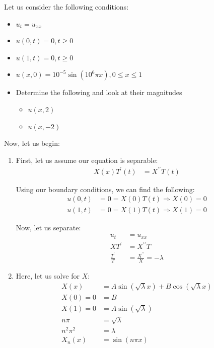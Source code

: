 \documentclass{article}
\begin{document}
\begin{enumerate}
  Let us consider the following conditions:
  \begin{itemize}
    \item $u_t = u_{xx}$
    \item $u(0, t) = 0, t \geq 0$
    \item $u(1, t) = 0, t \geq 0$
    \item $u(x, 0) = 10^{-5} \sin(10^6 \pi x), 0 \leq x \leq 1$
    \item Determine the following and look at their magnitudes
    \begin{itemize}
      \item $u(x, 2)$
      \item $u(x, -2)$
    \end{itemize}
  \end{itemize}

  Now, let us begin:

  \begin{enumerate}
    \item First, let us assume our equation is separable:
    \begin{align}
      X(x)T^\prime(t) & = X^{\prime\prime}T(t)
    \end{align}

    Using our boundary conditions, we can find the following:
    \begin{align}
      u(0, t) & = 0 = X(0)T(t) \Rightarrow X(0) = 0\\
      u(1, t) & = 0 = X(1)T(t) \Rightarrow X(1) = 0
    \end{align}

    Now, let us separate:
    \begin{align}
      u_t & = u_{xx}\\
      XT^\prime & = X^{\prime\prime}T\\
      \frac{T^\prime}{T} & = \frac{X^{\prime\prime}}{X} = -\lambda
    \end{align}

    \item Here, let us solve for $X$:
    \begin{align}
      X(x) & = A \sin( \sqrt \lambda x) + B \cos( \sqrt \lambda x)\\
      X(0) = 0 & = B\\
      X(1) = 0 & = A \sin( \sqrt \lambda )\\
      n \pi & = \sqrt \lambda\\
      n^2 \pi^2 & = \lambda\\
      X_n(x) & = \sin(n \pi x)
    \end{align}


\end{enumerate}
\end{enumerate}
\end{document}
